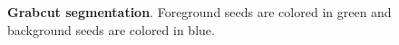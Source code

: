 \begin{figure}
{}\hspace{1em}
\caption{\textbf{Grabcut segmentation}. Foreground seeds are colored in green and background seeds are colored in blue.}
\end{figure}

